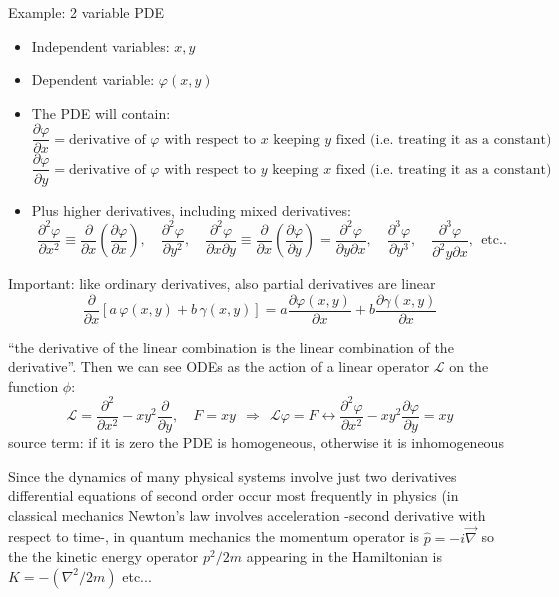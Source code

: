 \documentclass{article}
\begin{document}
\vspace{2mm}\noindent
Example: 2 variable PDE
\begin{itemize}
    \item Independent variables: $x, y$
    \item Dependent variable: $\varphi(x, y)$
    \item The PDE will contain:
    $$\frac{\partial \varphi}{\partial x} = \text{derivative of $\varphi$ with respect to $x$ keeping $y$ fixed (i.e. treating it as a constant)}$$
    $$\frac{\partial \varphi}{\partial y} = \text{derivative of $\varphi$ with respect to $y$ keeping $x$ fixed (i.e. treating it as a constant)}$$
    \item Plus higher derivatives, including mixed derivatives:
    $$\frac{\partial^2 \varphi}{\partial x^2} \equiv \frac{\partial}{\partial x} \left( \frac{\partial \varphi}{\partial x} \right), \quad
\frac{\partial^2 \varphi}{\partial y^2}, \quad
\frac{\partial^2 \varphi}{\partial x \partial y} \equiv \frac{\partial}{\partial x} \left( \frac{\partial \varphi}{\partial y} \right) =
\frac{\partial^2 \varphi}{\partial y \partial x}, \quad
\frac{\partial^3 \varphi}{\partial y^3}, \quad
\frac{\partial^3 \varphi}{\partial^2 y \partial x}, \ \ \text{etc..}$$
\end{itemize}

\noindent
Important: like ordinary derivatives, also partial derivatives are linear
$$\frac{\partial}{\partial x} \left[ a\, \varphi(x, y) + b\, \gamma(x, y) \right]
= a \frac{\partial \varphi(x, y)}{\partial x} + b \frac{\partial \gamma(x, y)}{\partial x}$$

\noindent
“the derivative of the linear combination is the linear combination of the derivative”. Then we can see ODEs as the action of a linear operator $\mathcal{L}$ on the function $\phi$:
\begin{equation*}
    \mathcal{L} = \frac{\partial^2}{\partial x^2} -xy^2 \frac{\partial}{\partial y}, \quad F=  xy \ \ \Rightarrow \ \ \boxed{\mathcal{L} \varphi = F \longleftrightarrow \frac{\partial^2 \varphi}{\partial x^2} -xy^2\frac{\partial \varphi}{\partial y} = xy}
\end{equation*}
source term: if it is zero the PDE is homogeneous, otherwise it is inhomogeneous

\noindent
Since the dynamics of many physical systems involve just two derivatives differential equations of second order occur most frequently in physics (in classical mechanics Newton’s law involves acceleration -second derivative with respect to time-, in quantum mechanics the momentum operator is $\hat{p} = -i \vec{\nabla}$ so the the kinetic energy operator $p^2 / 2m$ appearing in the Hamiltonian is $K = - (\nabla^2 / 2m)$ etc...
\end{document}
